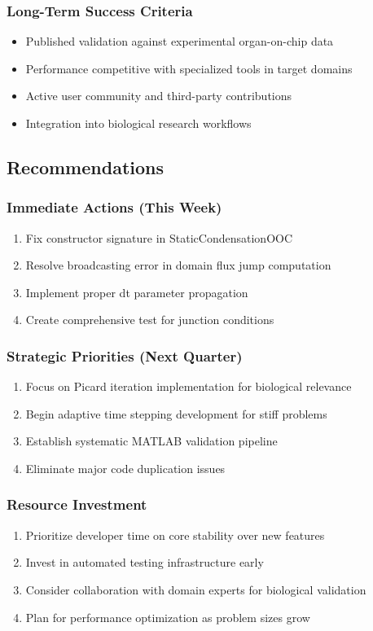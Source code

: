 \subsubsection{Long-Term Success Criteria}
\begin{itemize}
    \item Published validation against experimental organ-on-chip data
    \item Performance competitive with specialized tools in target domains
    \item Active user community and third-party contributions
    \item Integration into biological research workflows
\end{itemize}

\subsection{Recommendations}

\subsubsection{Immediate Actions (This Week)}
\begin{enumerate}
    \item Fix constructor signature in StaticCondensationOOC
    \item Resolve broadcasting error in domain flux jump computation
    \item Implement proper dt parameter propagation
    \item Create comprehensive test for junction conditions
\end{enumerate}

\subsubsection{Strategic Priorities (Next Quarter)}
\begin{enumerate}
    \item Focus on Picard iteration implementation for biological relevance
    \item Begin adaptive time stepping development for stiff problems
    \item Establish systematic MATLAB validation pipeline
    \item Eliminate major code duplication issues
\end{enumerate}

\subsubsection{Resource Investment}
\begin{enumerate}
    \item Prioritize developer time on core stability over new features
    \item Invest in automated testing infrastructure early
    \item Consider collaboration with domain experts for biological validation
    \item Plan for performance optimization as problem sizes grow
\end{enumerate}

